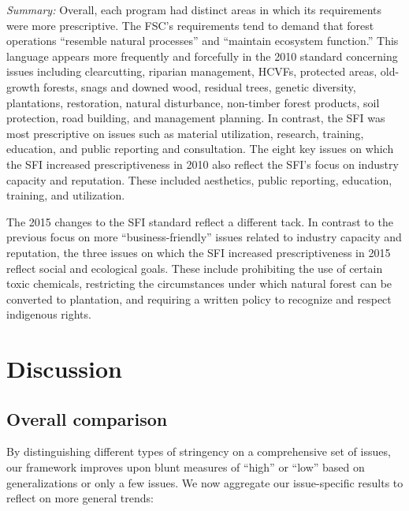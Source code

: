 \documentclass[
      12pt,
            Review ]{article}
\begin{document}
\emph{Summary:} Overall, each program had distinct areas in which its
requirements were more prescriptive. The FSC's requirements tend to
demand that forest operations ``resemble natural processes'' and
``maintain ecosystem function.'' This language appears more frequently
and forcefully in the 2010 standard concerning issues including
clearcutting, riparian management, HCVFs, protected areas, old-growth
forests, snags and downed wood, residual trees, genetic diversity,
plantations, restoration, natural disturbance, non-timber forest
products, soil protection, road building, and management planning. In
contrast, the SFI was most prescriptive on issues such as material
utilization, research, training, education, and public reporting and
consultation. The eight key issues on which the SFI increased
prescriptiveness in 2010 also reflect the SFI's focus on industry
capacity and reputation. These included aesthetics, public reporting,
education, training, and utilization.

The 2015 changes to the SFI standard reflect a different tack. In
contrast to the previous focus on more ``business-friendly'' issues
related to industry capacity and reputation, the three issues on which
the SFI increased prescriptiveness in 2015 reflect social and ecological
goals. These include prohibiting the use of certain toxic chemicals,
restricting the circumstances under which natural forest can be
converted to plantation, and requiring a written policy to recognize and
respect indigenous rights.

\section{Discussion}\label{discussion}

\subsection{Overall comparison}\label{overall-comparison}

By distinguishing different types of stringency on a comprehensive set
of issues, our framework improves upon blunt measures of ``high'' or
``low'' based on generalizations or only a few issues. We now aggregate
our issue-specific results to reflect on more general trends:
\end{document}
